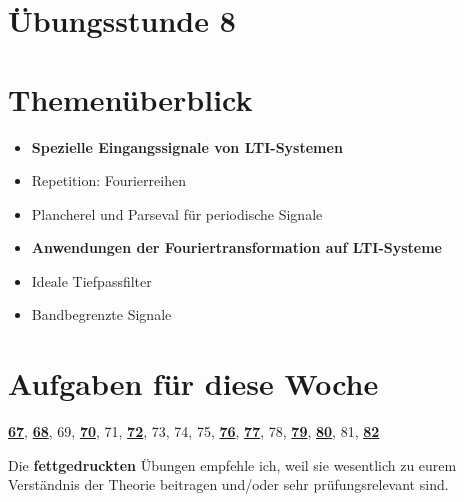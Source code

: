 \documentclass[11pt]{article}
\begin{document}
\thispagestyle{firstpage}

\setlength{\headheight}{1 \baselineskip}  %
\setlength{\parindent}{0pt}  %
\setlength{\parskip}{\baselineskip}  %

\vspace*{-5px}
\section*{Übungsstunde 8}

\section*{Themenüberblick}
\begin{itemize}
    \item \textbf{Spezielle Eingangssignale von LTI-Systemen}
    \item[] Repetition: Fourierreihen
    \item[] Plancherel und Parseval für periodische Signale
    \item \textbf{Anwendungen der Fouriertransformation auf LTI-Systeme}
    \item[] Ideale Tiefpassfilter
    \item[] Bandbegrenzte Signale
\end{itemize}

\section*{Aufgaben für diese Woche}
\vspace{-0.5cm}

\underline{\textbf{67}}, \underline{\textbf{68}}, 69, \underline{\textbf{70}}, 71, \underline{\textbf{72}}, 73, 74, 75, \underline{\textbf{76}}, \underline{\textbf{77}}, 78, \underline{\textbf{79}}, \underline{\textbf{80}}, 81, \underline{\textbf{82}}\\
\vspace{-0.5cm}

Die \textbf{fettgedruckten} Übungen empfehle ich, weil sie wesentlich zu eurem Verständnis der Theorie beitragen und/oder sehr prüfungsrelevant sind.

\vfill \null
\pagebreak
\end{document}
